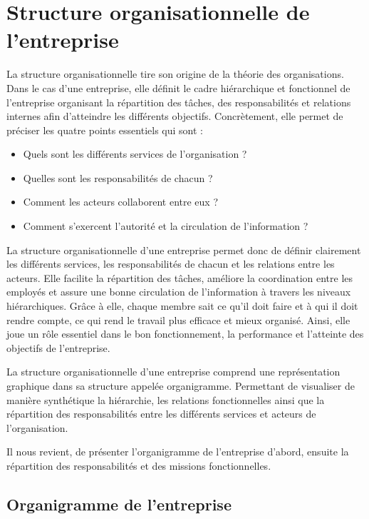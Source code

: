 \section{Structure organisationnelle de l'entreprise}

La structure organisationnelle tire son origine de la théorie des organisations. Dans le cas d'une entreprise, elle définit le cadre hiérarchique et fonctionnel de l'entreprise organisant la répartition des tâches, des responsabilités et relations internes afin d'atteindre les différents objectifs. Concrètement, elle permet de préciser les quatre points essentiels qui sont :

\begin{itemize}
    \item Quels sont les différents services de l'organisation ?
    \item Quelles sont les responsabilités de chacun ?
    \item Comment les acteurs collaborent entre eux ?
    \item Comment s'exercent l'autorité et la circulation de l'information ?
\end{itemize}

La structure organisationnelle d'une entreprise permet donc de définir clairement les différents services, les responsabilités de chacun et les relations entre les acteurs. Elle facilite la répartition des tâches, améliore la coordination entre les employés et assure une bonne circulation de l'information à travers les niveaux hiérarchiques. Grâce à elle, chaque membre sait ce qu'il doit faire et à qui il doit rendre compte, ce qui rend le travail plus efficace et mieux organisé. Ainsi, elle joue un rôle essentiel dans le bon fonctionnement, la performance et l'atteinte des objectifs de l'entreprise.

La structure organisationnelle d'une entreprise comprend une représentation graphique dans sa structure appelée organigramme. Permettant de visualiser de manière synthétique la hiérarchie, les relations fonctionnelles ainsi que la répartition des responsabilités entre les différents services et acteurs de l'organisation.

Il nous revient, de présenter l'organigramme de l'entreprise d'abord, ensuite la répartition des responsabilités et des missions fonctionnelles.

\subsection{Organigramme de l'entreprise}

